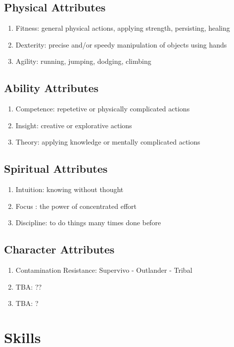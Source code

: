 \subsection{Physical Attributes}
\begin{enumerate}[label= -]
    \item {Fitness}: general physical actions, applying strength, persisting, healing
    \item {Dexterity}: precise and/or speedy manipulation of objects using hands
    \item {Agility}: running, jumping, dodging, climbing
\end{enumerate}
\subsection{Ability Attributes}
\begin{enumerate}[label= -]
    \item {Competence}: repetetive or physically complicated actions
    \item {Insight}: creative or explorative actions
    \item {Theory}: applying knowledge or mentally complicated actions
\end{enumerate}
\subsection{Spiritual Attributes}
\begin{enumerate}[label= -]
    \item {Intuition}: knowing without thought
    \item {Focus} \label{itm:focus}: the power of concentrated effort
    \item {Discipline}: to do things many times done before
\end{enumerate}
\subsection{Character Attributes}
\begin{enumerate}[label= -]
    \item {Contamination Resistance}: Supervivo - Outlander - Tribal
    \item {TBA}: ??
    \item {TBA}: ?
\end{enumerate}

\section{Skills}\label{sec:skills}


